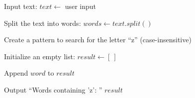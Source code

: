 \begin{algorithm}
\caption{Find Words Containing the Letter 'z'}
\begin{algorithmic}[1]

\STATE Input text:
\STATE $text \gets$ user input

\STATE Split the text into words:
\STATE $words \gets text.split()$

\STATE Create a pattern to search for the letter ``z'' (case-insensitive)

\STATE Initialize an empty list:
\STATE $result \gets [\ ]$

        \STATE Append $word$ to $result$
    \ENDIF
\ENDFOR

\STATE Output ``Words containing 'z': '' $result$

\end{algorithmic}
\end{algorithm}